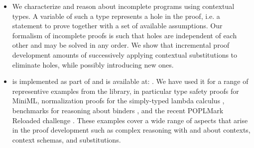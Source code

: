 \begin{itemize}
\item
  We characterize and reason about incomplete programs using contextual
  types.
  A variable of such a type represents a hole in the proof, i.e. a statement to
  prove together with a set of available assumptions.
  Our formalism of incomplete proofs is such that holes are independent of each
  other and may be solved in any order.
  We show that incremental proof development amounts of successively applying
  contextual substitutions to eliminate holes, while possibly introducing new
  ones.

\item
  \Harpoon{} is implemented as part of \Beluga{} and is available
  at: .
  We have used it for a range of representive examples from the
  \Beluga{} library, in particular type safety proofs for
  MiniML, normalization proofs for the simply-typed lambda calculus
  \cite{Cave:MSCS18},
  benchmarks for reasoning about binders
  \cite{Felty:MSCS17,Felty:orbi-survey}, and the recent POPLMark Reloaded
  challenge \cite{POPLMarkReloaded:19}.
  These examples cover a wide range of aspects that arise in the
  proof development such as complex reasoning with and about contexts,
  context schemas, and substitutions.
\end{itemize}


